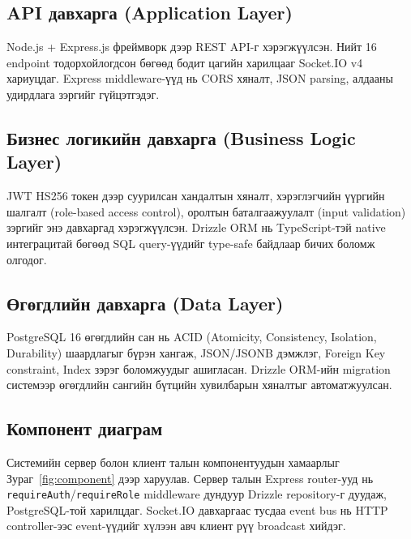 \subsection{API давхарга (Application Layer)}

Node.js + Express.js фреймворк дээр REST API-г хэрэгжүүлсэн. Нийт 16 endpoint
тодорхойлогдсон бөгөөд бодит цагийн харилцааг Socket.IO v4 хариуцдаг.
Express middleware-үүд нь CORS хяналт, JSON parsing, алдааны удирдлага зэргийг
гүйцэтгэдэг.

\subsection{Бизнес логикийн давхарга (Business Logic Layer)}

JWT HS256 токен дээр суурилсан хандалтын хяналт, хэрэглэгчийн үүргийн шалгалт
(role-based access control), оролтын баталгаажуулалт (input validation) зэргийг
энэ давхаргад хэрэгжүүлсэн. Drizzle ORM нь TypeScript-тэй native интеграцитай
бөгөөд SQL query-үүдийг type-safe байдлаар бичих боломж олгодог.

\subsection{Өгөгдлийн давхарга (Data Layer)}

PostgreSQL 16 өгөгдлийн сан нь ACID (Atomicity, Consistency, Isolation, Durability)
шаардлагыг бүрэн хангаж, JSON/JSONB дэмжлэг, Foreign Key constraint, Index зэрэг
боломжуудыг ашигласан. Drizzle ORM-ийн migration системээр өгөгдлийн сангийн бүтцийн
хувилбарын хяналтыг автоматжуулсан.

\subsection{Компонент диаграм}

Системийн сервер болон клиент талын компонентуудын хамаарлыг Зураг~\ref{fig:component}
дээр харуулав. Сервер талын Express router-ууд нь \texttt{requireAuth}/\texttt{requireRole}
middleware дундуур Drizzle repository-г дуудаж, PostgreSQL-той харилцдаг. Socket.IO
давхаргаас тусдаа event bus нь HTTP controller-ээс event-үүдийг хүлээн авч клиент
рүү broadcast хийдэг.

